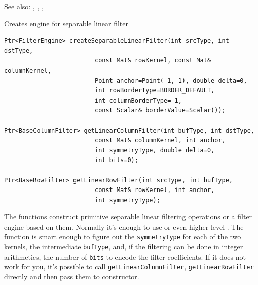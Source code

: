See also: , , , 

\label{createSeparableLinearFilter}
Creates engine for separable linear filter

\begin{lstlisting}
Ptr<FilterEngine> createSeparableLinearFilter(int srcType, int dstType,
                         const Mat& rowKernel, const Mat& columnKernel,
                         Point anchor=Point(-1,-1), double delta=0,
                         int rowBorderType=BORDER_DEFAULT,
                         int columnBorderType=-1,
                         const Scalar& borderValue=Scalar());
                         
Ptr<BaseColumnFilter> getLinearColumnFilter(int bufType, int dstType,
                         const Mat& columnKernel, int anchor,
                         int symmetryType, double delta=0,
                         int bits=0);
                         
Ptr<BaseRowFilter> getLinearRowFilter(int srcType, int bufType,
                         const Mat& rowKernel, int anchor,
                         int symmetryType);
\end{lstlisting}
\begin{description}
\end{description}

The functions construct primitive separable linear filtering operations or a filter engine based on them. Normally it's enough to use  or even higher-level . The function  is smart enough to figure out the \texttt{symmetryType} for each of the two kernels, the intermediate \texttt{bufType}, and, if the filtering can be done in integer arithmetics, the number of \texttt{bits} to encode the filter coefficients. If it does not work for you, it's possible to call \texttt{getLinearColumnFilter}, \texttt{getLinearRowFilter} directly and then pass them to  constructor.

